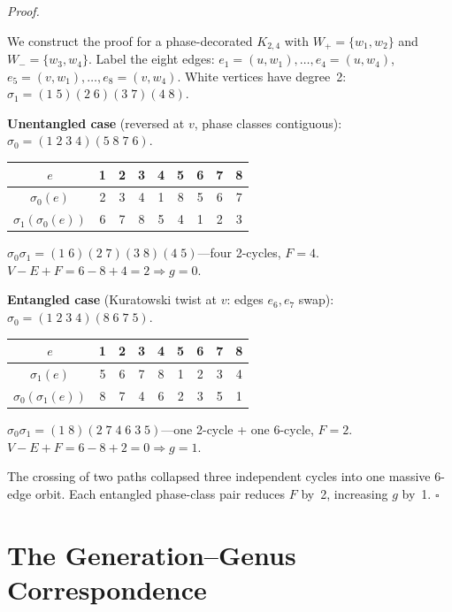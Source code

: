\documentclass[11pt, a4paper, openany]{book}
\renewenvironment{proof}[1][Proof]{%
  \par\noindent\textit{#1.}\quad
}{\hfill$\square$\par\medskip}
\begin{document}
\begin{proof}
We construct the proof for a phase-decorated $K_{2,4}$ with $W_+ = \{w_1, w_2\}$ and $W_- = \{w_3, w_4\}$. Label the eight edges: $e_1 = (u,w_1),\ldots, e_4 = (u,w_4)$, $e_5 = (v,w_1),\ldots, e_8 = (v,w_4)$. White vertices have degree~2: $\sigma_1 = (1\;5)(2\;6)(3\;7)(4\;8)$.

\medskip\noindent\textbf{Unentangled case} (reversed at $v$, phase classes contiguous):
$\sigma_0 = (1\;2\;3\;4)(5\;8\;7\;6)$.
\begin{center}
\renewcommand{\arraystretch}{1.15}
\begin{tabular}{c@{\;\;}c@{\;\;}c@{\;\;}c@{\;\;}c@{\;\;}c@{\;\;}c@{\;\;}c@{\;\;}c}
\toprule
$e$ & 1 & 2 & 3 & 4 & 5 & 6 & 7 & 8 \\
\midrule
$\sigma_0(e)$ & 2 & 3 & 4 & 1 & 8 & 5 & 6 & 7 \\
$\sigma_1(\sigma_0(e))$ & 6 & 7 & 8 & 5 & 4 & 1 & 2 & 3 \\
\bottomrule
\end{tabular}
\end{center}
$\sigma_0\sigma_1 = (1\;6)(2\;7)(3\;8)(4\;5)$---four 2-cycles, $F = 4$. $V - E + F = 6 - 8 + 4 = 2 \Rightarrow \boxed{g = 0}$. \checkmark

\medskip\noindent\textbf{Entangled case} (Kuratowski twist at $v$: edges $e_6, e_7$ swap):
$\sigma_0 = (1\;2\;3\;4)(8\;6\;7\;5)$.
\begin{center}
\renewcommand{\arraystretch}{1.15}
\begin{tabular}{c@{\;\;}c@{\;\;}c@{\;\;}c@{\;\;}c@{\;\;}c@{\;\;}c@{\;\;}c@{\;\;}c}
\toprule
$e$ & 1 & 2 & 3 & 4 & 5 & 6 & 7 & 8 \\
\midrule
$\sigma_1(e)$ & 5 & 6 & 7 & 8 & 1 & 2 & 3 & 4 \\
$\sigma_0(\sigma_1(e))$ & 8 & 7 & 4 & 6 & 2 & 3 & 5 & 1 \\
\bottomrule
\end{tabular}
\end{center}
$\sigma_0\sigma_1 = (1\;8)(2\;7\;4\;6\;3\;5)$---one 2-cycle + one 6-cycle, $F = 2$. $V - E + F = 6 - 8 + 2 = 0 \Rightarrow \boxed{g = 1}$. \checkmark

The crossing of two paths collapsed three independent cycles into one massive 6-edge orbit. Each entangled phase-class pair reduces $F$ by~2, increasing $g$ by~1.
\end{proof}

\section{The Generation--Genus Correspondence}
\end{document}
